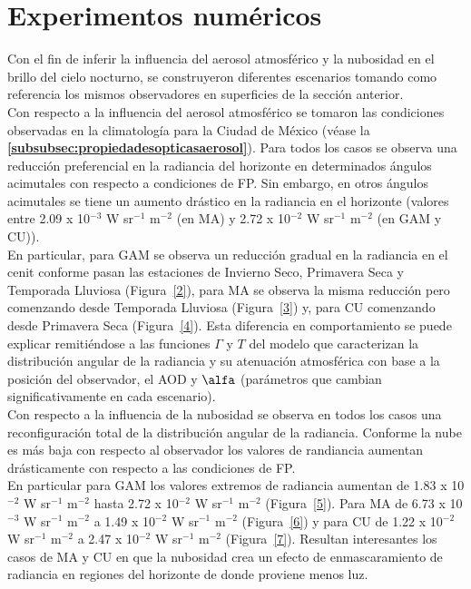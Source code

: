 \newpage

\section{Experimentos numéricos}

Con el fin de inferir la influencia del aerosol atmosférico y la nubosidad en el brillo del cielo nocturno, se construyeron diferentes escenarios tomando como referencia los mismos observadores en superficies de la sección anterior.\\

Con respecto a la influencia del aerosol atmosférico se tomaron las condiciones observadas en la climatología para la Ciudad de México (véase la \textbf{\autoref{subsubsec:propiedadesopticasaerosol}}). Para todos los casos se observa una reducción preferencial en la radiancia del horizonte en determinados ángulos acimutales con respecto a condiciones de FP. Sin embargo, en otros ángulos acimutales se tiene un aumento drástico en la radiancia en el horizonte (valores entre 2.09 x 10$^{-3}$ W sr$^{-1}$ m$^{-2}$ (en MA) y 2.72 x 10$^{-2}$ W sr$^{-1}$ m$^{-2}$ (en GAM y CU)).\\

En particular, para GAM se observa un reducción gradual en la radiancia en el cenit conforme pasan las estaciones de Invierno Seco, Primavera Seca y Temporada Lluviosa (Figura~\ref{2}), para MA se observa la misma reducción pero comenzando desde Temporada Lluviosa (Figura~\ref{3}) y, para CU comenzando desde Primavera Seca (Figura~\ref{4}). Esta diferencia en comportamiento se puede explicar remitiéndose a las funciones $\Gamma$ y $T$ del modelo que caracterizan la distribución angular de la radiancia y su atenuación atmosférica con base a la posición del observador, el AOD y $\alfa$ (parámetros que cambian significativamente en cada escenario).\\

Con respecto a la influencia de la nubosidad se observa en todos los casos una reconfiguración total de la distribución angular de la radiancia. Conforme la nube es más baja con respecto al observador los valores de randiancia aumentan drásticamente con respecto a las condiciones de FP.\\

En particular para GAM los valores extremos de radiancia aumentan de 1.83 x 10$^{-2}$ W sr$^{-1}$ m$^{-2}$ hasta 2.72 x 10$^{-2}$ W sr$^{-1}$ m$^{-2}$ (Figura~\ref{5}). Para MA de 6.73 x 10$^{-3}$ W sr$^{-1}$ m$^{-2}$ a 1.49 x 10$^{-2}$ W sr$^{-1}$ m$^{-2}$ (Figura~\ref{6}) y para CU de 1.22 x 10$^{-2}$ W sr$^{-1}$ m$^{-2}$ a 2.47 x 10$^{-2}$ W sr$^{-1}$ m$^{-2}$ (Figura~\ref{7}). Resultan interesantes los casos de MA y CU en que la nubosidad crea un efecto de enmascaramiento de radiancia en regiones del horizonte de donde proviene menos luz.\\

